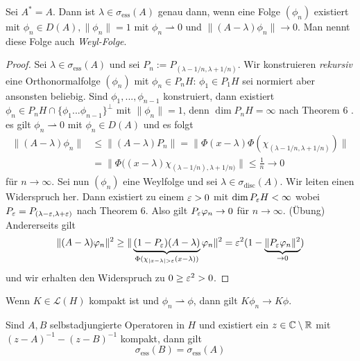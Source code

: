 \documentclass{mycourse}
\begin{document}
\begin{st}[Weyl]
Sei $A^*=A$. Dann ist $\lambda \in \sigma_{\text{ess}}(A)$ genau dann, wenn eine Folge $(\phi_n)$ existiert mit $\phi_n\in D(A), \|\phi_n\|=1$ mit $\phi_n \rightharpoonup 0$ und $\|(A-\lambda) \phi_n\| \to 0$. Man nennt diese Folge auch \emph{Weyl-Folge}.
\end{st}

\begin{proof}
Sei $\lambda\in \sigma_{\text{ess}}(A)$ und sei $P_n:= P_{(\lambda-1/n, \lambda+ 1/n)}$. Wir konstruieren \emph{rekursiv} eine Orthonormalfolge $(\phi_n)$ mit $\phi_n\in P_n H$: $\phi_1 \in P_1H$ sei normiert aber ansonsten beliebig. Sind $\phi_1, ..., \phi_{n-1}$ konstruiert, dann existiert $\phi_n \in P_n H \cap \{\phi_1... \phi_{n-1}\}^\perp$ mit $\|\phi_n \| =1$, denn $\dim P_n H=\infty$ nach Theorem 6 \fixme. es gilt $\phi_n \rightharpoonup 0$ mit $\phi_n \in D(A)$ und es folgt
\begin{align*}
\|(A-\lambda) \phi_n \| &\le \| (A-\lambda) P_n\| = \| \Phi(x-\lambda) \Phi(\chi_{(\lambda-1/n, \lambda+1/n)}) \|\\
&= \| \Phi((x-\lambda) \chi_{(\lambda-1/n), \lambda + 1/n)} \| \le \frac{1}{n} \to 0
\end{align*}
für $n\to \infty$. Sei nun $(\phi_n)$ eine Weylfolge und sei $\lambda \in \sigma_{\text{disc}} (A)$. Wir leiten einen Widerspruch her. Dann existiert zu einem $\varepsilon >0$ mit $\dim P_\varepsilon H<\infty$ wobei $P_\varepsilon= P_{(\lambda-\varepsilon, \lambda+\varepsilon)}$ nach Theorem 6. Also gilt $P_\varepsilon \varphi_n \to 0$ für $n\to \infty$. (Übung)
Andererseits gilt
\[
\| (A-\lambda) \phi_n\|^2 \ge \| \underbrace{(1-P_\eps) (A-\lambda)}_{\Phi(\chi_{|x-\lambda|>\eps} (x-\lambda))} \phi_n\|^2 = \eps^2(1-\underbrace{\| P_\eps \phi_n\|^2}_{\to 0})
\]
und wir erhalten den Widerspruch zu $0 \ge \varepsilon^2 >0$.
\end{proof}
\begin{nt*}
Wenn $K\in \mathcal L(H)$ kompakt ist und $\phi_n \rightharpoonup \phi$, dann gilt $K\phi_n \to K\phi$.
\end{nt*}
\begin{st}
Sind $A,B$ selbstadjungierte Operatoren in $H$ und existiert ein $z\in \mathbb{C}\setminus\mathbb{R}$ mit $(z-A)^{-1} - (z-B)^{-1}$ kompakt, dann gilt
\[
\sigma_{\text{ess}} (B) = \sigma_{\text{ess}}(A)
\]
\end{st}
\end{document}
